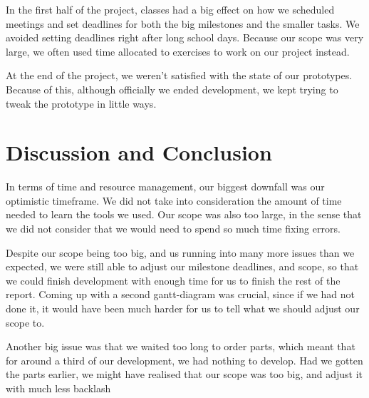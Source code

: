 In the first half of the project, classes had a big effect on how we scheduled meetings and set deadlines for both the big milestones and the smaller tasks. We avoided setting deadlines right after long school days. Because our scope was very large, we often used time allocated to exercises to work on our project instead.

At the end of the project, we weren't satisfied with the state of our prototypes. Because of this, although officially we ended development, we kept trying to tweak the prototype in little ways.

\clearpage
\section{Discussion and Conclusion}

In terms of time and resource management, our biggest downfall was our optimistic timeframe. We did not take into consideration  the amount of time needed to learn the tools we used. Our scope was also too large, in the sense that we did not consider that we would need to spend so much time fixing errors.

Despite our scope being too big, and us running into many more issues than we expected, we were still able to adjust our milestone deadlines, and scope, so that we could finish development with enough time for us to finish the rest of the report. Coming up with a second gantt-diagram was crucial, since if we had not done it, it would have been much harder for us to tell what we should adjust our scope to.

Another big issue was that we waited too long to order parts, which meant that for around a third of our development, we had nothing to develop. Had we gotten the parts earlier, we might have realised that our scope was too big, and adjust it with much less backlash
